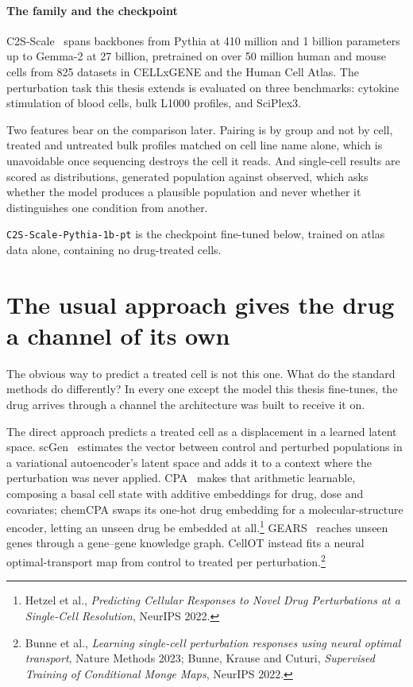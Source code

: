 \paragraph{The family and the checkpoint}
C2S-Scale~\cite{c2sscale} spans backbones from Pythia at 410 million and 1
billion parameters up to Gemma-2 at 27 billion, pretrained on over 50 million
human and mouse cells from 825 datasets in CELLxGENE and the Human Cell Atlas.
The perturbation task this thesis extends is evaluated on three benchmarks:
cytokine stimulation of blood cells, bulk L1000 profiles, and SciPlex3.

Two features bear on the comparison later. Pairing is by group and not by cell,
treated and untreated bulk profiles matched on cell line name alone, which is
unavoidable once sequencing destroys the cell it reads. And single-cell results
are scored as distributions, generated population against observed, which asks
whether the model produces a plausible population and never whether it
distinguishes one condition from another.

\texttt{C2S-Scale-Pythia-1b-pt} is the checkpoint fine-tuned below, trained on
atlas data alone, containing no drug-treated cells.

\section{The usual approach gives the drug a channel of its own}
\label{sec:lit-chem}
\framedecl{-}

\begin{question}
The obvious way to predict a treated cell is not this one. What do the standard
methods do differently? In every one except the model this thesis fine-tunes, the
drug arrives through a channel the architecture was built to receive it on.
\end{question}

\noindent
The direct approach predicts a treated cell as a displacement in a learned
latent space. scGen~\cite{scgen} estimates the vector between control and
perturbed populations in a variational autoencoder's latent space and adds it to
a context where the perturbation was never applied. CPA~\cite{cpa} makes that
arithmetic learnable, composing a basal cell state with additive embeddings for
drug, dose and covariates; chemCPA swaps its one-hot drug embedding for a
molecular-structure encoder, letting an unseen drug be embedded at
all.\footnote{Hetzel et al., \emph{Predicting Cellular Responses to Novel Drug
Perturbations at a Single-Cell Resolution}, NeurIPS 2022.} GEARS~\cite{gears}
reaches unseen genes through a gene--gene knowledge graph. CellOT instead fits a
neural optimal-transport map from control to treated per perturbation.\footnote{
Bunne et al., \emph{Learning single-cell perturbation responses using neural
optimal transport}, Nature Methods 2023; Bunne, Krause and Cuturi,
\emph{Supervised Training of Conditional Monge Maps}, NeurIPS 2022.}

